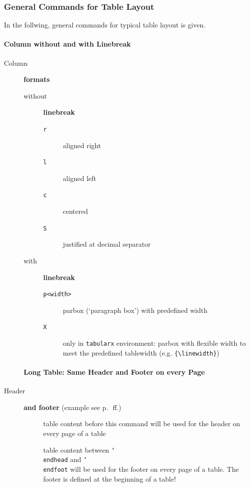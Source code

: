 \documentclass{pharmrep}
\makeatletter
\DeclareRobustCommand\meta[1]{%
   \ensuremath\langle
   \ifmmode \expandafter \nfss@text \fi
   {%
      \meta@font@select
      \edef\meta@hyphen@restore
      {\hyphenchar\the\font\the\hyphenchar\font}%
      \hyphenchar\font\m@ne
      \language\l@nohyphenation
      #1\/%
      \meta@hyphen@restore
   }\ensuremath\rangle
}
\DeclareRobustCommand\cs[1]{\texttt{\char`\\#1}}
\providecommand\oarg[1]{%
   {\ttfamily[}\meta{#1}{\ttfamily]}}
\def\meta@font@select{\itshape}
\makeatother
\begin{document}
\bigskip

\subsubsection{General Commands for Table Layout}
In the follwing, general commands for typical table layout is given.

\paragraph{Column without and with Linebreak}

\begin{description}
   \item[Column] \textbf{formats}
   \begin{description}
      \item[without] \textbf{linebreak}
      \begin{description}
         \item[\texttt{r}] aligned right
         \item[\texttt{l}] aligned left
         \item[\texttt{c}] centered
         \item[\texttt{S}] justified at decimal separator
      \end{description}
      \item[with] \textbf{linebreak}
      \begin{description}
         \item[\texttt{p{<width>}}] parbox (`paragraph box') with predefined width
         \item[\texttt{X}] only in \texttt{tabularx} environment: parbox with flexible width to meet
         the
         predefined tablewidth (e.g. \verb|{\linewidth}|)
      \end{description}
   \end{description}

   \paragraph{Long Table: Same Header and Footer on every Page}
   \item[Header] \textbf{and footer} (example see p.~\pageref{subsubsec:longtables}\,ff.)
   \begin{description}
      \item[\cs{endhead\oarg{optional argument}}] table content before this command
      will
      be used for the header on every page of a table
      \item[\cs{endfoot\oarg{optional argument}}] table content between
      \cs{endhead} and \cs{endfoot} will be used for the footer on
      every page of a table. The footer is defined at the beginning of a table!
   \end{description}


\end{description}
\end{document}
